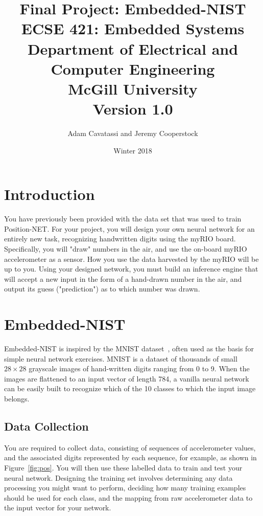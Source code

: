 \documentclass{article}
\title{Final Project: Embedded-NIST\\
  \large ECSE 421: Embedded Systems \\ Department of Electrical and Computer Engineering \\ McGill University \\ Version 1.0}
\author{Adam Cavatassi and Jeremy Cooperstock}
\date{Winter 2018}
\begin{document}
\maketitle

\section{Introduction}
You have previously been provided with the data set that was used to train Position-NET. For your project, you will design your own neural network for an entirely new task, recognizing handwritten digits using the myRIO board. Specifically, you will "draw" numbers in the air, and use the on-board myRIO accelerometer as a sensor. How you use the data harvested by the myRIO will be up to you. Using your designed network, you must build an inference engine that will accept a new input in the form of a hand-drawn number in the air, and output its guess ("prediction") as to which number was drawn. 


\section{Embedded-NIST}

Embedded-NIST is inspired by the MNIST dataset~\cite{mnist}, often used as the basis for simple neural network exercises.
MNIST is a dataset of thousands of small $28 \times 28$ grayscale images of hand-written digits ranging from 0 to 9. When the images are flattened to an input vector of length 784, a vanilla neural network can be easily built to recognize which of the 10 classes to which the input image belongs. 

\subsection{Data Collection}

You are required to collect data, consisting of sequences of accelerometer values, and the associated digits represented by each sequence, for example, as shown in Figure~\ref{fig:pos}.  You will then use these labelled data to train and test your neural network. Designing the training set involves determining any data processing you might want to perform, deciding how many training examples should be used for each class, and the mapping from raw accelerometer data to the input vector for your network. 
\end{document}
